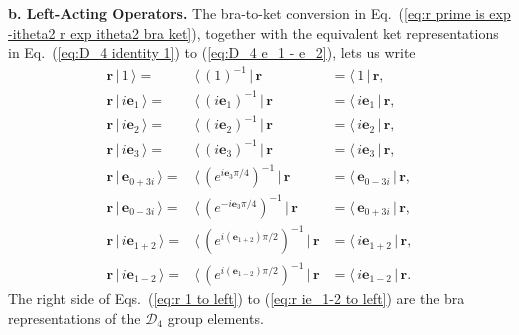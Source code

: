 \documentclass[11pt,twocolumn]{article}
\begin{document}
\textbf{b.  Left-Acting Operators.}  
The bra-to-ket conversion in Eq.~(\ref{eq:r prime is exp -itheta2 r exp itheta2 bra ket}), together with the equivalent ket representations in Eq.~(\ref{eq:D_4 identity 1}) to (\ref{eq:D_4 e_1 - e_2}), lets us write
\begin{eqnarray}
\label{eq:r 1 to left}
\mathbf r\,|\,1\,\rangle=&\langle\,(1)^{-1}\,|\,\mathbf r&=\langle \,1\,|\,\mathbf r,\\
\label{eq:r ie_1 to left}
\mathbf r\,|\,i\mathbf e_1\,\rangle=&\langle\,(i\mathbf e_1)^{-1}\,|\,\mathbf r&=\langle\,i\mathbf e_1\,|\,\mathbf r,\\
\label{eq:r ie_2 to left}
\mathbf r\,|\,i\mathbf e_2\,\rangle=&\langle\,(i\mathbf e_2)^{-1}\,|\,\mathbf r&=\langle\,i\mathbf e_2\,|\,\mathbf r,\\
\label{eq:r ie_3 to left}
\mathbf r\,|\,i\mathbf e_3\,\rangle=&\langle\,(i\mathbf e_3)^{-1}\,|\,\mathbf r&=\langle\,i\mathbf e_3\,|\,\mathbf r,\\
\label{eq:r e_0+3i to left}
\mathbf r\,|\,\mathbf e_{0+3i}\,\rangle=&\langle\,(e^{i\mathbf e_3\pi/4})^{-1}\,|\,\mathbf r&=\langle\,\mathbf e_{0-3i}\,|\,\mathbf r,\\
\label{eq:r e_0-3i to left}
\mathbf r\,|\,\mathbf e_{0-3i}\,\rangle=&\langle\,(e^{-i\mathbf e_3\pi/4})^{-1}\,|\,\mathbf r&=\langle\,\mathbf e_{0+3i}\,|\,\mathbf r,\\
\label{eq:r ie_1+2 to left}
\mathbf r\,|\,i\mathbf e_{1+2}\,\rangle=&\langle\,(e^{i(\mathbf e_{1+2})\pi/2})^{-1}\,|\,\mathbf r&=\langle\,i\mathbf e_{1+2}\,|\,\mathbf r,\\
\label{eq:r ie_1-2 to left}
\mathbf r\,|\,i\mathbf e_{1-2}\,\rangle=&\langle\,(e^{i(\mathbf e_{1-2})\pi/2})^{-1}\,|\,\mathbf r&=\langle\,i\mathbf e_{1-2}\,|\,\mathbf r.
\end{eqnarray}
The right side of Eqs.~(\ref{eq:r 1 to left}) to (\ref{eq:r ie_1-2 to left}) are the bra representations of the $\mathcal D_4$ group elements.
\end{document}
